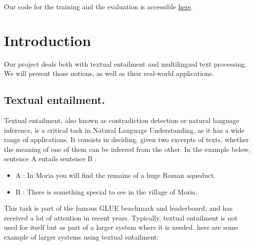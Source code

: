 \documentclass[final]{cvpr}
\begin{document}
Our code for the training and the evaluation is accessible  \href{https://github.com/DentanJeremie/contradictionDetection.git}{here}.

\section{Introduction}

Our project deals both with textual entailment and multilingual text processing. We will present those notions, as well as their real-world applications.

\subsection{Textual entailment.}

Textual entailment, also known as contradiction detection or natural language inference, is a critical task in Natural Language Understanding, as it has a wide range of applications. It consists in deciding, given two excerpts of texts, whether the meaning of one of them can be inferred from the other. In the example below, sentence A entails sentence B : 

\begin{itemize}
    \item A : In Moria you will find the remains of a huge Roman aqueduct.

    \item B : There is something special to see in the village of Moria.
\end{itemize}

This task is part of the famous GLUE benchmark and leaderboard, and has received a lot of attention in recent years. Typically, textual entailment is not used for itself but as part of a larger system where it is needed. here are some example of larger systems using textual entailment:
\end{document}
